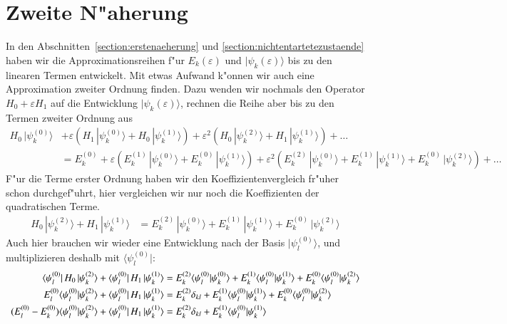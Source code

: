 \section{Zweite N"aherung}
In den Abschnitten~\ref{section:erstenaeherung} und
\ref{section:nichtentartetezustaende} haben wir die Approximationsreihen
f"ur $E_k(\varepsilon)$ und $|\psi_k(\varepsilon)\rangle$
bis zu den linearen Termen entwickelt.
Mit etwas Aufwand k"onnen wir auch eine Approximation zweiter Ordnung
finden.
Dazu wenden wir nochmals den Operator $H_0+\varepsilon H_1$
auf die Entwicklung $|\psi_k(\varepsilon)\rangle$, rechnen die Reihe aber bis
zu den Termen zweiter Ordnung aus
\begin{align*}
H_0\,|\psi_k^{(0)}\rangle
&+
\varepsilon
(
H_1\,|\psi_k^{(0)}\rangle
+
H_0\,|\psi_k^{(1)}\rangle
)
+
\varepsilon^2
(
H_0\,|\psi_k^{(2)}\rangle
+
H_1\,|\psi_k^{(1)}\rangle
)
+
\dots
\\
&=
E_k^{(0)}
+
\varepsilon
(
E_k^{(1)}\,|\psi_k^{(0)}\rangle
+
E_k^{(0)}\,|\psi_k^{(1)}\rangle
)
+
\varepsilon^2
(
E_k^{(2)}\,|\psi_k^{(0)}\rangle
+
E_k^{(1)}\,|\psi_k^{(1)}\rangle
+
E_k^{(0)}\,|\psi_k^{(2)}\rangle
)
+
\dots
\end{align*}
F"ur die Terme erster Ordnung haben wir den Koeffizientenvergleich
fr"uher schon durchgef"uhrt, hier vergleichen wir nur noch die
Koeffizienten der quadratischen Terme.
\begin{align*}
H_0\,|\psi_k^{(2)}\rangle
+
H_1\,|\psi_k^{(1)}\rangle
&=
E_k^{(2)}\,|\psi_k^{(0)}\rangle
+
E_k^{(1)}\,|\psi_k^{(1)}\rangle
+
E_k^{(0)}\,|\psi_k^{(2)}\rangle
\end{align*}
Auch hier brauchen wir wieder eine Entwicklung nach der Basis
$|\psi_l^{(0)}\rangle$, und multiplizieren deshalb mit
$\langle\psi_l^{(0)}|$:
\begin{align}
\langle\psi_l^{(0)}|\,H_0\,|\psi_k^{(2)}\rangle
+
\langle\psi_l^{(0)}|\,H_1\,|\psi_k^{(1)}\rangle
&=
E_k^{(2)}\langle\psi_l^{(0)}|\psi_k^{(0)}\rangle
+
E_k^{(1)}\langle\psi_l^{(0)}|\psi_k^{(1)}\rangle
+
E_k^{(0)}\langle\psi_l^{(0)}|\psi_k^{(2)}\rangle
\notag
\\
E_l^{(0)}\langle\psi_l^{(0)}|\psi_k^{(2)}\rangle
+
\langle\psi_l^{(0)}|\,H_1\,|\psi_k^{(1)}\rangle
&=
E_k^{(2)}\delta_{kl}
+
E_k^{(1)}\langle\psi_l^{(0)}|\psi_k^{(1)}\rangle
+
E_k^{(0)}\langle\psi_l^{(0)}|\psi_k^{(2)}\rangle
\notag
\\
(E_l^{(0)}-E_k^{(0)})\langle\psi_l^{(0)}|\psi_k^{(2)}\rangle
+
\langle\psi_l^{(0)}|\,H_1\,|\psi_k^{(1)}\rangle
&=
E_k^{(2)}\delta_{kl}
+
E_k^{(1)}\langle\psi_l^{(0)}|\psi_k^{(1)}\rangle
\label{zweitenaeherung}
\end{align}
